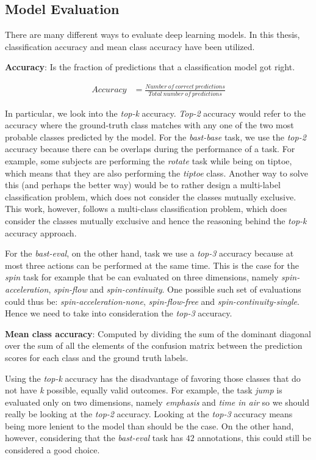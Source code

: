 \documentclass[extern,palatino]{cgMA}
\begin{document}
\subsection{Model Evaluation}
\label{model_evaluation}
There are many different ways to evaluate deep learning models. In this thesis, classification accuracy and mean class accuracy have been utilized.

\bigskip
\noindent\textbf{Accuracy}: Is the fraction of predictions that a classification model got right.

\begin{align*}
    Accuracy &= \frac{Number \ of \ correct \ predictions}{Total \ number \ of \ predictions}
\end{align*}

\noindent In particular, we look into the  \textit{top-k} accuracy. \textit{Top-2} accuracy would refer to the accuracy where the ground-truth class matches with any one of the two most probable classes predicted by the model. For the \textit{bast-base} task, we use the \textit{top-2} accuracy because there can be overlaps during the performance of a task. For example, some subjects are performing the \textit{rotate} task while being on tiptoe, which means that they are also performing the \textit{tiptoe} class. Another way to solve this (and perhaps the better way) would be to rather design a multi-label classification problem, which does not consider the classes mutually exclusive. This work, however, follows a multi-class classification problem, which does consider the classes mutually exclusive and hence the reasoning behind the \textit{top-k} accuracy approach.

For the \textit{bast-eval}, on the other hand, task we use a \textit{top-3} accuracy because at most three actions can be performed at the same time. This is the case for the \textit{spin} task for example that be can evaluated on three dimensions, namely \textit{spin-acceleration}, \textit{spin-flow} and \textit{spin-continuity}. One possible such set of evaluations could thus be: \textit{spin-acceleration-none}, \textit{spin-flow-free} and \textit{spin-continuity-single}. Hence we need to take into consideration the \textit{top-3} accuracy.

\bigskip
\noindent\textbf{Mean class accuracy}: Computed by dividing the sum of the dominant diagonal over the sum of all the elements of the confusion matrix between the prediction scores for each class and the ground truth labels. 

\bigskip
\noindent Using the \textit{top-k} accuracy has the disadvantage of favoring those classes that do not have \textit{k} possible, equally valid outcomes. For example, the task \textit{jump} is evaluated only on two dimensions, namely \textit{emphasis} and \textit{time in air} so we should really be looking at the \textit{top-2} accuracy. Looking at the \textit{top-3} accuracy means being more lenient to the model than should be the case. On the other hand, however, considering that the \textit{bast-eval} task has $42$ annotations, this could still be considered a good choice. 
\end{document}
